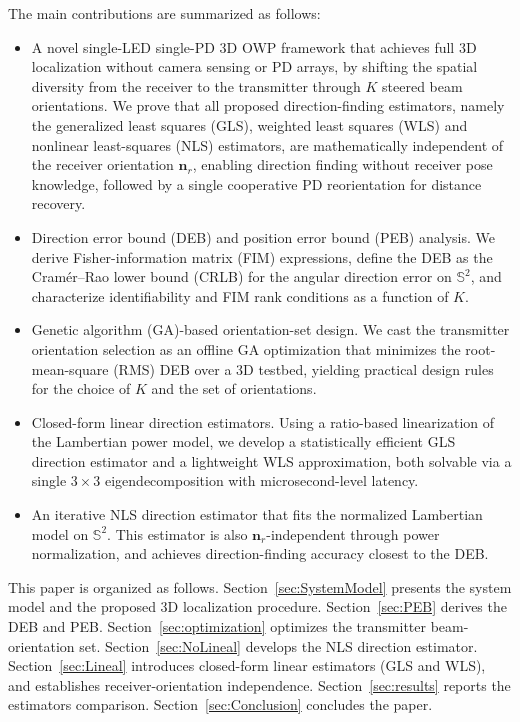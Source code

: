 \documentclass[journal]{IEEEtran}
\begin{document}
The main contributions are summarized as follows:
\begin{itemize}
    \item A novel single-LED single-PD 3D OWP framework that achieves full 3D localization without camera sensing or PD arrays, by shifting the spatial diversity from the receiver to the transmitter through $K$ steered beam orientations. We prove that all proposed direction-finding estimators, namely the generalized least squares (GLS), weighted least squares (WLS) and nonlinear least-squares (NLS) estimators, are mathematically independent of the receiver orientation $\mathbf{n}_r$, enabling direction finding without receiver pose knowledge, followed by a single cooperative PD reorientation for distance recovery.
    \item Direction error bound (DEB) and position error bound (PEB) analysis. We derive Fisher-information matrix (FIM) expressions, define the DEB as the Cramér--Rao lower bound (CRLB) for the angular direction error on $\mathbb{S}^2$, and characterize identifiability and FIM rank conditions as a function of $K$.
    \item Genetic algorithm (GA)-based orientation-set design. We cast the transmitter orientation selection as an offline GA optimization that minimizes the root-mean-square (RMS) DEB over a 3D testbed, yielding practical design rules for the choice of $K$ and the set of orientations.
    \item Closed-form linear direction estimators. Using a ratio-based linearization of the Lambertian power model, we develop a statistically efficient GLS direction estimator and a lightweight WLS approximation, both solvable via a single $3\times3$ eigendecomposition with microsecond-level latency.
    \item An iterative NLS direction estimator that fits the normalized Lambertian model on $\mathbb{S}^2$. This estimator is also $\mathbf{n}_r$-independent through power normalization, and achieves direction-finding accuracy closest to the DEB.
\end{itemize}

This paper is organized as follows.
Section~\ref{sec:SystemModel} presents the system model and the proposed 3D localization procedure.
Section~\ref{sec:PEB} derives the DEB and PEB.
Section~\ref{sec:optimization} optimizes the transmitter beam-orientation set.
Section~\ref{sec:NoLineal} develops the NLS direction estimator.
Section~\ref{sec:Lineal} introduces closed-form linear estimators (GLS and WLS), and establishes receiver-orientation independence.
Section~\ref{sec:results} reports the estimators comparison.
Section~\ref{sec:Conclusion} concludes the paper.
\end{document}

